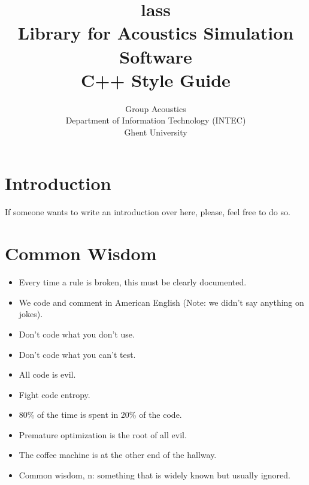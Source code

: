 \documentclass[10pt,a4paper,titlepage,dutch]{report}
\begin{document}
\title{lass\\Library for Acoustics Simulation Software\\C++ Style Guide}
\author{Group Acoustics\\Department of Information Technology (INTEC)\\Ghent University}



\maketitle

\tableofcontents

\chapter{Introduction}

If someone wants to write an introduction over here, please, feel
free to do so.


\chapter{Common Wisdom}

\begin{itemize}
    \item Every time a rule is broken, this must be clearly documented.
    \item We code and comment in American English (Note: we didn't say
anything on jokes).
    \item Don't code what you don't use.
    \item Don't code what you can't test.
    \item All code is evil.
    \item Fight code entropy.
    \item 80\% of the time is spent in 20\% of the code.
    \item Premature optimization is the root of all evil.
    \item The coffee machine is at the other end of the hallway.
    \item Common wisdom, n: something that is widely known but usually
ignored.
\end{itemize}
\end{document}

